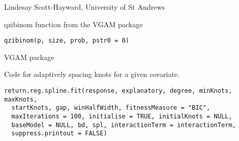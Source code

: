 \documentclass[a4paper]{book}
\begin{document}
%
\begin{Author}\relax
Lindesay Scott-Hayward, University of St Andrews
\end{Author}
%
\begin{Description}\relax
qzibinom function from the VGAM package
\end{Description}
%
\begin{Usage}
\begin{verbatim}
qzibinom(p, size, prob, pstr0 = 0)
\end{verbatim}
\end{Usage}
%
\begin{Author}\relax
VGAM package
\end{Author}
%
\begin{Description}\relax
Code for adaptively spacing knots for a given covariate.
\end{Description}
%
\begin{Usage}
\begin{verbatim}
return.reg.spline.fit(response, explanatory, degree, minKnots, maxKnots,
  startKnots, gap, winHalfWidth, fitnessMeasure = "BIC",
  maxIterations = 100, initialise = TRUE, initialKnots = NULL,
  baseModel = NULL, bd, spl, interactionTerm = interactionTerm,
  suppress.printout = FALSE)
\end{verbatim}
\end{Usage}
%
\end{document}
